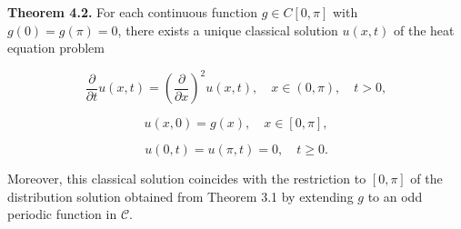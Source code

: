 \textbf{Theorem 4.2.} For each continuous function $g \in C[0, \pi]$ with $g(0) = g(\pi) = 0$, there exists a unique classical solution $u(x, t)$ of the heat equation problem

$$\frac{\partial}{\partial t} u(x, t) = \left( \frac{\partial}{\partial x} \right)^2 u(x, t), \quad x \in (0, \pi), \quad t > 0,$$

$$u(x, 0) = g(x), \quad x \in [0, \pi],$$

$$u(0, t) = u(\pi, t) = 0, \quad t \geq 0.$$

Moreover, this classical solution coincides with the restriction to $[0, \pi]$ of the distribution solution obtained from Theorem 3.1 by extending $g$ to an odd periodic function in $\mathcal{C}$.
